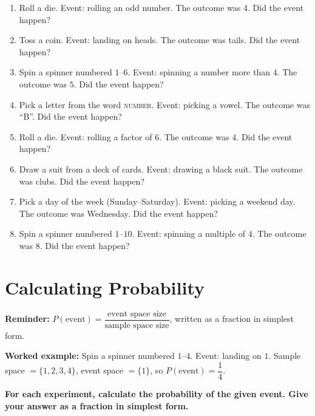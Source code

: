 \documentclass[11pt]{article}
\newcommand{\ans}{\hrulefill}
\newcommand{\anshere}{\par\vspace{0.4em}\noindent\ans\par\vspace{0.4em}}
\begin{document}
\begin{enumerate}[label=(\alph*)]
  \item Roll a die. Event: rolling an odd number. The outcome was $4$. Did the event happen?
  \anshere
  \item Toss a coin. Event: landing on heads. The outcome was tails. Did the event happen?
  \anshere
  \item Spin a spinner numbered $1$--$6$. Event: spinning a number more than $4$. The outcome was
    $5$. Did the event happen?
  \anshere
  \item Pick a letter from the word \textsc{number}. Event: picking a vowel. The outcome was
    ``B''. Did the event happen?
  \anshere
  \item Roll a die. Event: rolling a factor of $6$. The outcome was $4$. Did the event happen?
  \anshere
  \item Draw a suit from a deck of cards. Event: drawing a black suit. The outcome was clubs.
    Did the event happen?
  \anshere
  \item Pick a day of the week (Sunday--Saturday). Event: picking a weekend day. The outcome was
    Wednesday. Did the event happen?
  \anshere
  \item Spin a spinner numbered $1$--$10$. Event: spinning a multiple of $4$. The outcome was
    $8$. Did the event happen?
  \anshere
\end{enumerate}

\newpage

\section*{Calculating Probability}
\noindent\textbf{Reminder:} $P(\text{event}) = \dfrac{\text{event space size}}{\text{sample
space size}}$, written as a fraction in simplest form.

\vspace{0.3em}
\noindent\textbf{Worked example:} Spin a spinner numbered $1$--$4$. Event: landing on $1$.
Sample space $=\{1,2,3,4\}$, event space $=\{1\}$, so $P(\text{event}) = \dfrac{1}{4}$.

\vspace{0.5em}
\noindent\textbf{For each experiment, calculate the probability of the given event. Give your
answer as a fraction in simplest form.}
\end{document}
